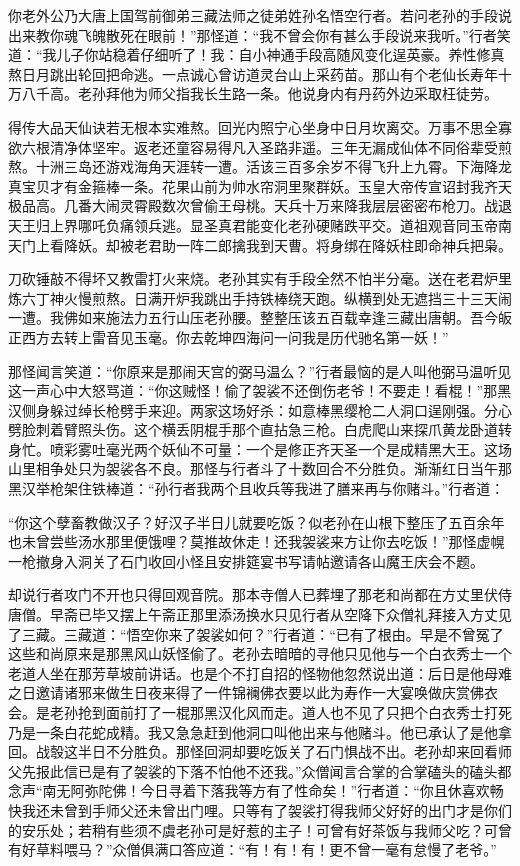 \documentclass[12pt,UTF8]{ctexbook}
\begin{document}
{你老外公乃大唐上国驾前御弟三藏法师之徒弟姓孙名悟空行者。若问老孙的手段说出来教你魂飞魄散死在眼前！”那怪道：“我不曾会你有甚么手段说来我听。”行者笑道：“我儿子你站稳着仔细听了！我：自小神通手段高随风变化逞英豪。养性修真熬日月跳出轮回把命逃。一点诚心曾访道灵台山上采药苗。那山有个老仙长寿年十万八千高。老孙拜他为师父指我长生路一条。他说身内有丹药外边采取枉徒劳。

得传大品天仙诀若无根本实难熬。回光内照宁心坐身中日月坎离交。万事不思全寡欲六根清净体坚牢。返老还童容易得凡入圣路非遥。三年无漏成仙体不同俗辈受煎熬。十洲三岛还游戏海角天涯转一遭。活该三百多余岁不得飞升上九霄。下海降龙真宝贝才有金箍棒一条。花果山前为帅水帘洞里聚群妖。玉皇大帝传宣诏封我齐天极品高。几番大闹灵霄殿数次曾偷王母桃。天兵十万来降我层层密密布枪刀。战退天王归上界哪吒负痛领兵逃。显圣真君能变化老孙硬赌跌平交。道祖观音同玉帝南天门上看降妖。却被老君助一阵二郎擒我到天曹。将身绑在降妖柱即命神兵把枭。

刀砍锤敲不得坏又教雷打火来烧。老孙其实有手段全然不怕半分毫。送在老君炉里炼六丁神火慢煎熬。日满开炉我跳出手持铁棒绕天跑。纵横到处无遮挡三十三天闹一遭。我佛如来施法力五行山压老孙腰。整整压该五百载幸逢三藏出唐朝。吾今皈正西方去转上雷音见玉毫。你去乾坤四海问一问我是历代驰名第一妖！”

那怪闻言笑道：“你原来是那闹天宫的弼马温么？”行者最恼的是人叫他弼马温听见这一声心中大怒骂道：“你这贼怪！偷了袈裟不还倒伤老爷！不要走！看棍！”那黑汉侧身躲过绰长枪劈手来迎。两家这场好杀：如意棒黑缨枪二人洞口逞刚强。分心劈脸刺着臂照头伤。这个横丢阴棍手那个直拈急三枪。白虎爬山来探爪黄龙卧道转身忙。喷彩雾吐毫光两个妖仙不可量：一个是修正齐天圣一个是成精黑大王。这场山里相争处只为袈裟各不良。那怪与行者斗了十数回合不分胜负。渐渐红日当午那黑汉举枪架住铁棒道：“孙行者我两个且收兵等我进了膳来再与你赌斗。”行者道：

“你这个孽畜教做汉子？好汉子半日儿就要吃饭？似老孙在山根下整压了五百余年也未曾尝些汤水那里便饿哩？莫推故休走！还我袈裟来方让你去吃饭！”那怪虚幌一枪撤身入洞关了石门收回小怪且安排筵宴书写请帖邀请各山魔王庆会不题。

却说行者攻门不开也只得回观音院。那本寺僧人已葬埋了那老和尚都在方丈里伏侍唐僧。早斋已毕又摆上午斋正那里添汤换水只见行者从空降下众僧礼拜接入方丈见了三藏。三藏道：“悟空你来了袈裟如何？”行者道：“已有了根由。早是不曾冤了这些和尚原来是那黑风山妖怪偷了。老孙去暗暗的寻他只见他与一个白衣秀士一个老道人坐在那芳草坡前讲话。也是个不打自招的怪物他忽然说出道：后日是他母难之日邀请诸邪来做生日夜来得了一件锦襕佛衣要以此为寿作一大宴唤做庆赏佛衣会。是老孙抢到面前打了一棍那黑汉化风而走。道人也不见了只把个白衣秀士打死乃是一条白花蛇成精。我又急急赶到他洞口叫他出来与他赌斗。他已承认了是他拿回。战彀这半日不分胜负。那怪回洞却要吃饭关了石门惧战不出。老孙却来回看师父先报此信已是有了袈裟的下落不怕他不还我。”众僧闻言合掌的合掌磕头的磕头都念声“南无阿弥陀佛！今日寻着下落我等方有了性命矣！”行者道：“你且休喜欢畅快我还未曾到手师父还未曾出门哩。只等有了袈裟打得我师父好好的出门才是你们的安乐处；若稍有些须不虞老孙可是好惹的主子！可曾有好茶饭与我师父吃？可曾有好草料喂马？”众僧俱满口答应道：“有！有！有！更不曾一毫有怠慢了老爷。”

}
\end{document}
